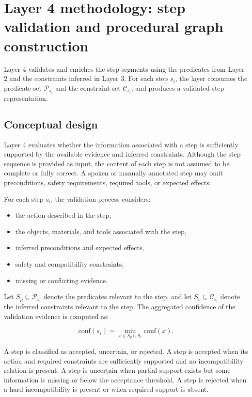 \section{Layer 4 methodology: step validation and procedural graph construction}
\label{sec:layer4-method}

Layer 4 validates and enriches the step segments using the predicates from Layer 2 and the constraints inferred in Layer 3. For each step $s_i$, the layer consumes the predicate set $\mathcal{P}_{s_i}$ and the constraint set $\mathcal{C}_{s_i}$, and produces a validated step representation.

\subsection{Conceptual design}

Layer 4 evaluates whether the information associated with a step is sufficiently supported by the available evidence and inferred constraints. Although the step sequence is provided as input, the content of each step is not assumed to be complete or fully correct. A spoken or manually annotated step may omit preconditions, safety requirements, required tools, or expected effects.

For each step $s_i$, the validation process considers:

\begin{itemize}
    \item the action described in the step,
    \item the objects, materials, and tools associated with the step,
    \item inferred preconditions and expected effects,
    \item safety and compatibility constraints,
    \item missing or conflicting evidence.
\end{itemize}

Let $S_p \subseteq \mathcal{P}_{s_i}$ denote the predicates relevant to the step, and let $S_c \subseteq \mathcal{C}_{s_i}$ denote the inferred constraints relevant to the step. The aggregated confidence of the validation evidence is computed as:

\[
\text{conf}(s_i) = \min_{x \in S_p \cup S_c} \text{conf}(x).
\]

A step is classified as accepted, uncertain, or rejected. A step is accepted when its action and required constraints are sufficiently supported and no incompatibility relation is present. A step is uncertain when partial support exists but some information is missing or below the acceptance threshold. A step is rejected when a hard incompatibility is present or when required support is absent.

